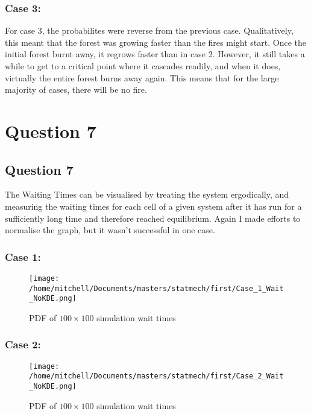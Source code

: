 \documentclass[11pt,a4paper]{article}
\begin{document}
\subsubsection{Case 3:}
For case 3, the probabilites were reverse from the previous case. Qualitatively, this meant that the forest was growing faster than the fires might start. Once the initial forest burnt away, it regrows faster than in case 2. However, it still takes a while to get to a critical point where it cascades readily, and when it does, virtually the entire forest burns away again. This means that for the large majority of cases, there will be no fire. 

\section{Question 7}
\label{sec:question7}


\subsection{Question 7}
\label{sec:question7:subsec:parta}

The Waiting Times can be visualised by treating the system ergodically, and measuring the waiting times for each cell of a given system after it has run for a sufficiently long time and therefore reached equilibrium. Again I made efforts to normalise the graph, but it wasn't successful in one case. 
\subsubsection{Case 1: }

\begin{figure}[H]
\centering
\texttt{[image: /home/mitchell/Documents/masters/statmech/first/Case\_1\_Wait\_NoKDE.png]}
\caption{PDF of $100 \times 100$ simulation wait times}
\end{figure}
\subsubsection{Case 2: }

\begin{figure}[H]
\centering
\texttt{[image: /home/mitchell/Documents/masters/statmech/first/Case\_2\_Wait\_NoKDE.png]}
\caption{PDF of $100 \times 100$ simulation wait times}
\end{figure}
\end{document}
